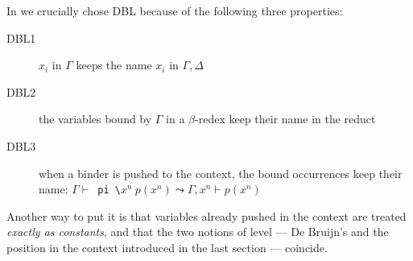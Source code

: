 \documentclass{llncs}
\begin{document}
In \elpi{} we crucially chose DBL because of the following three properties:
\begin{description}
\item[DBL1] $x_i$ in $\Gamma$ keeps the name $x_i$ in $\Gamma, \Delta$
\item[DBL2] the variables bound by $\Gamma$ in a $\beta$-redex keep their name in the reduct
\item[DBL3] when a binder is pushed to the context, the bound occurrences keep
 their name: $\Gamma \vdash $\verb+ pi \+$ x^n \ p(x^n) \leadsto \Gamma, x^n \vdash p(x^n)$
\end{description}
Another way to put it is that variables already pushed in the context
are treated \emph{exactly as constants}, and that the two notions of level
--- De Bruijn's and the position in the context introduced in the last section --- coincide.

%
\end{document}
